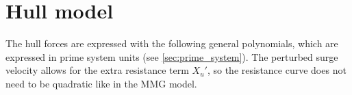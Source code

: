\section{Hull model} \label{sec:hull}
The hull forces are expressed with the following general polynomials, which are expressed in prime system units (see \autoref{sec:prime_system}). The perturbed surge velocity allows for the extra resistance term ${X_u}'$, so the resistance curve does not need to be quadratic like in the MMG model.  
\begin{equation}
    \label{eq:X_H}
    
\end{equation}
%
\begin{equation}
    \label{eq:Y_H}
    
\end{equation}
%
\begin{equation}
    \label{eq:N_H}
    
\end{equation}